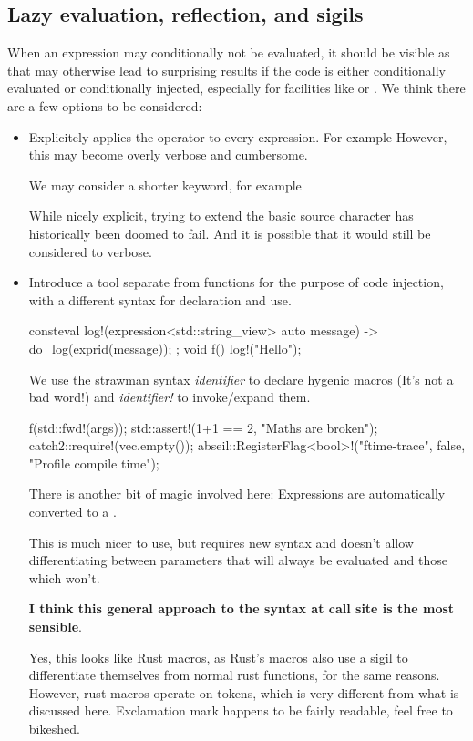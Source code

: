 \documentclass{wg21}
\begin{document}
\subsection{Lazy evaluation, reflection, and sigils}

When an expression may conditionally not be evaluated, it should be visible as that may otherwise lead to surprising results
if the code is either conditionally evaluated or conditionally injected, especially for facilities like  or .
We think there are a few options to be considered:

\begin{itemize}
    \item Explicitely applies the  operator to every expression. For example 
    However, this may become overly verbose and cumbersome.
    
    We may consider a shorter keyword, for example 
    
    While nicely explicit, trying to extend the basic source character has historically been doomed to fail. And it is possible that it would still be considered to verbose.
    
    \item Introduce a tool separate from  functions for the purpose of code injection, with a different syntax for declaration and use.
    
\begin{codeblock}
consteval log!(expression<std::string_view> auto message) {
    -> do_log(exprid(message));
};
void f() {
    log!("Hello");
}
\end{codeblock}
     We use the strawman syntax  \emph{identifier}  to declare hygenic macros (It's not a bad word!) and \emph{identifier!}
     to invoke/expand them.
     
\begin{codeblock}
f(std::fwd!(args));
std::assert!(1+1 == 2, "Maths are broken");
catch2::require!(vec.empty());
abseil::RegisterFlag<bool>!("ftime-trace", false, "Profile compile time");
\end{codeblock}

     There is another bit of magic involved here: Expressions are automatically converted to a .
     
     This is much nicer to use, but requires new syntax and doesn't allow differentiating between parameters that will always be evaluated and those which won't.
     
     \textbf{I think this general approach to the syntax at call site is the most sensible}.
   
\begin{note}
Yes, this looks like Rust macros, as Rust's macros also use a sigil to differentiate themselves from normal rust functions,
for the same reasons. However, rust macros operate on tokens, which is very different from what is discussed here.
Exclamation mark \tcode{!} happens to be fairly readable, feel free to bikeshed.
\end{note}
     
\end{itemize}
\end{document}
